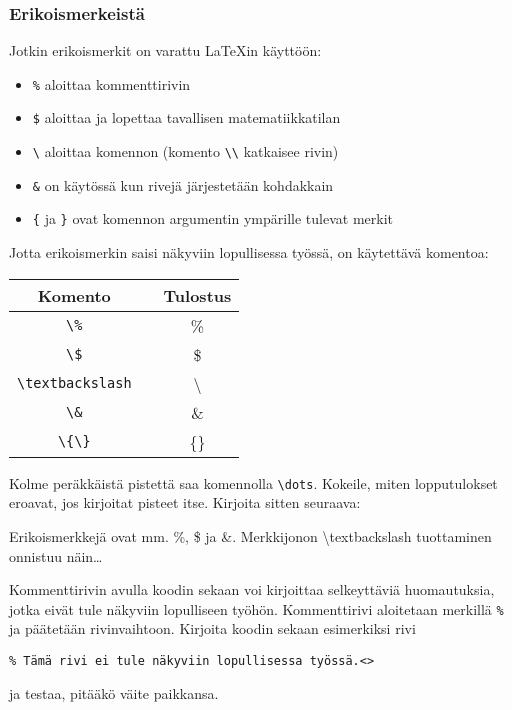 \begin{fframe}
    \frametitle{Erikoismerkeistä}
    Jotkin erikoismerkit on varattu \LaTeX in käyttöön:
    \begin{itemize}[<+->]
        \item \lstinline-%- aloittaa kommenttirivin
        \item \lstinline-$- aloittaa ja lopettaa tavallisen matematiikkatilan
        \item \lstinline-\- aloittaa komennon (komento \lstinline-\\- katkaisee rivin)
        \item \lstinline-&- on käytössä kun rivejä järjestetään kohdakkain
        \item \lstinline-{- ja \lstinline-}- ovat komennon argumentin ympärille tulevat merkit
    \end{itemize}\pause
    Jotta erikoismerkin saisi näkyviin lopullisessa työssä, on käytettävä komentoa:
    \begin{table}[H]
        \begin{tabular}{ccc}
            Komento & & Tulostus\\
            \hline
            \verb-\%- & & \%\\
            \verb-\$- & & \$\\
            \verb-\textbackslash- & & \textbackslash\\
            \verb-\&- & & \&\\
            \verb-\{\}- & & \{\}
        \end{tabular}
    \end{table}
\end{fframe}

\begin{fframe}
    \begin{harj}
        Kolme peräkkäistä pistettä saa komennolla \lstinline-\dots-. Kokeile, miten lopputulokset eroavat, jos kirjoitat pisteet itse.  Kirjoita sitten seuraava:
        \begin{sample}
            Erikoismerkkejä ovat mm. \%, \$ ja \&. Merkkijonon \textbackslash textbackslash tuottaminen onnistuu näin\dots
        \end{sample}
    \end{harj}
    \begin{harj}
        Kommenttirivin avulla koodin sekaan voi kirjoittaa selkeyttäviä huomautuksia, jotka eivät tule näkyviin lopulliseen työhön. Kommenttirivi aloitetaan merkillä \lstinline-%- ja päätetään rivinvaihtoon. 
        \vaihto
        Kirjoita koodin sekaan esimerkiksi rivi
        \begin{lstlisting}
% Tämä rivi ei tule näkyviin lopullisessa työssä.<>
        \end{lstlisting}
        ja testaa, pitääkö väite paikkansa.
    \end{harj}
\end{fframe}

